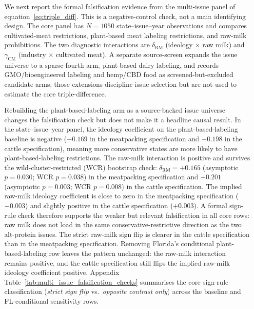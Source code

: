\documentclass[12pt]{article}
\begin{document}
We next report the formal falsification evidence from the multi-issue panel of equation~\eqref{eq:triple_diff}.  This is a negative-control check, not a main identifying design.  The core panel has $N = 1050$ state--issue--year observations and compares cultivated-meat restrictions, plant-based meat labeling restrictions, and raw-milk prohibitions.  The two diagnostic interactions are $\delta_{\mathrm{RM}}$ (ideology $\times$ raw milk) and $\gamma_{\mathrm{CM}}$ (industry $\times$ cultivated meat).  A separate source-screen expands the issue universe to a sparse fourth arm, plant-based dairy labeling, and records GMO/bioengineered labeling and hemp/CBD food as screened-but-excluded candidate arms; those extensions discipline issue selection but are not used to estimate the core triple-difference.

Rebuilding the plant-based-labeling arm as a source-backed issue universe changes the falsification check but does not make it a headline causal result.  In the state--issue--year panel, the ideology coefficient on the plant-based-labeling baseline is negative ($-0.169$ in the meatpacking specification and $-0.198$ in the cattle specification), meaning more conservative states are more likely to have plant-based-labeling restrictions.  The raw-milk interaction is positive and survives the wild-cluster-restricted (WCR) bootstrap check: $\delta_{\mathrm{RM}}=+0.165$ (asymptotic $p=0.030$; WCR $p=0.038$) in the meatpacking specification and $+0.201$ (asymptotic $p=0.003$; WCR $p=0.008$) in the cattle specification.  The implied raw-milk ideology coefficient is close to zero in the meatpacking specification ($-0.003$) and slightly positive in the cattle specification ($+0.003$).  A formal sign-rule check therefore supports the weaker but relevant falsification in all core rows: raw milk does not load in the same conservative-restrictive direction as the two alt-protein issues.  The strict raw-milk sign flip is clearer in the cattle specification than in the meatpacking specification.  Removing Florida's conditional plant-based-labeling row leaves the pattern unchanged: the raw-milk interaction remains positive, and the cattle specification still flips the implied raw-milk ideology coefficient positive.  Appendix Table~\ref{tab:multi_issue_falsification_checks} summarises the core sign-rule classification (\emph{strict sign flip} vs.\ \emph{opposite contrast only}) across the baseline and FL-conditional sensitivity rows.
\end{document}
